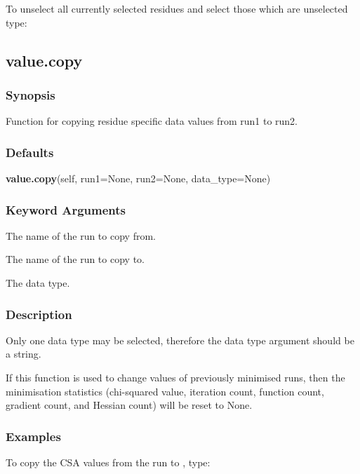 To unselect all currently selected residues and select those which are unselected type:




\newpage

\subsection{value.copy}


\subsubsection{Synopsis}

Function for copying residue specific data values from run1 to run2.

\subsubsection{Defaults}

\textsf{\textbf{value.copy}(self, run1=None, run2=None, data\_type=None)}


\subsubsection{Keyword Arguments}


  The name of the run to copy from.

  The name of the run to copy to.

  The data type.

\subsubsection{Description}

Only one data type may be selected, therefore the data type argument should be a string.

If this function is used to change values of previously minimised runs, then the
minimisation statistics (chi-squared value, iteration count, function count, gradient count,
and Hessian count) will be reset to None.


\subsubsection{Examples}

To copy the CSA values from the run 
 to 
, type:

